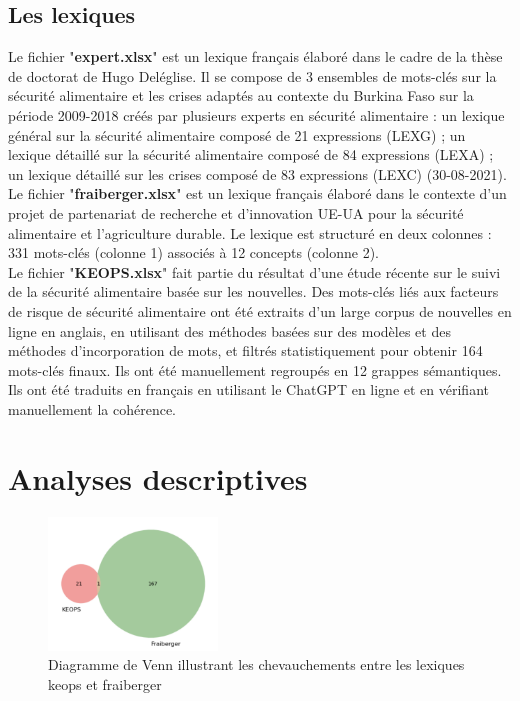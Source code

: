 \documentclass{article}
\begin{document}
\subsection{Les lexiques}
Le fichier "\textbf{expert.xlsx}" est un lexique français élaboré dans le cadre de la thèse de doctorat de Hugo Deléglise. Il se compose de 3 ensembles de mots-clés sur la sécurité alimentaire et les crises adaptés au contexte du Burkina Faso sur la période 2009-2018 créés par plusieurs experts en sécurité alimentaire : un lexique général sur la sécurité alimentaire composé de 21 expressions (LEXG) ; un lexique détaillé sur la sécurité alimentaire composé de 84 expressions (LEXA) ; un lexique détaillé sur les crises composé de 83 expressions (LEXC) (30-08-2021). \\

Le fichier "\textbf{fraiberger.xlsx}" est un lexique français élaboré dans le contexte d'un projet de partenariat de recherche et d'innovation UE-UA pour la sécurité alimentaire et l'agriculture durable. Le lexique est structuré en deux colonnes : 331 mots-clés (colonne 1) associés à 12 concepts (colonne 2). \\

Le fichier "\textbf{KEOPS.xlsx}" fait partie du résultat d'une étude récente sur le suivi de la sécurité alimentaire basée sur les nouvelles. Des mots-clés liés aux facteurs de risque de sécurité alimentaire ont été extraits d'un large corpus de nouvelles en ligne en anglais, en utilisant des méthodes basées sur des modèles et des méthodes d'incorporation de mots, et filtrés statistiquement pour obtenir 164 mots-clés finaux. Ils ont été manuellement regroupés en 12 grappes sémantiques. Ils ont été traduits en français en utilisant le ChatGPT en ligne et en vérifiant manuellement la cohérence.

\section{Analyses descriptives}
\begin{figure}[h]
    \centering
    \includegraphics[width=0.4\textwidth]{keopsFraiberger.png}
    \caption{Diagramme de Venn illustrant les chevauchements entre les lexiques keops et fraiberger }
    \label{fig:keops_fraiberger}
\end{figure}
\end{document}
